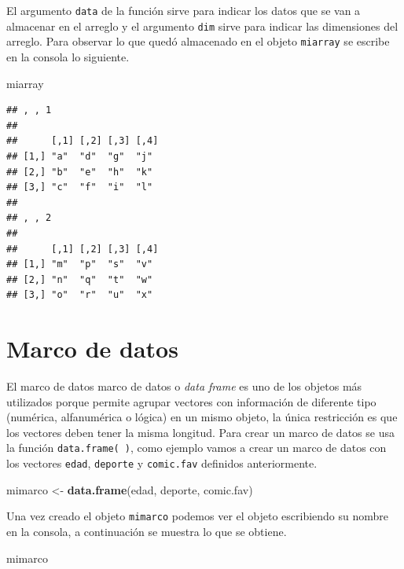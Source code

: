 \documentclass[10pt,]{krantz}
\makeatletter
\newenvironment{Shaded}{\begin{snugshade}}{\end{snugshade}}
\newcommand{\KeywordTok}[1]{\textcolor[rgb]{0.13,0.29,0.53}{\textbf{{#1}}}}
\newcommand{\StringTok}[1]{\textcolor[rgb]{0.31,0.60,0.02}{{#1}}}
\newcommand{\NormalTok}[1]{{#1}}
\newenvironment{kframe}{%
\medskip{}
\setlength{\fboxsep}{.8em}
 \def\at@end@of@kframe{}%
 \ifinner\ifhmode%
  \def\at@end@of@kframe{\end{minipage}}%
  \begin{minipage}{\columnwidth}%
 \fi\fi%
 \def\FrameCommand##1{\hskip\@totalleftmargin \hskip-\fboxsep
 \colorbox{shadecolor}{##1}\hskip-\fboxsep
     \hskip-\linewidth \hskip-\@totalleftmargin \hskip\columnwidth}%
 \MakeFramed {\advance\hsize-\width
   \@totalleftmargin\z@ \linewidth\hsize
   \@setminipage}}%
 {\par\unskip\endMakeFramed%
 \at@end@of@kframe}
\renewenvironment{Shaded}{\begin{kframe}}{\end{kframe}}
\makeatother
\begin{document}
El argumento \texttt{data} de la función sirve para indicar los datos
que se van a almacenar en el arreglo y el argumento \texttt{dim} sirve
para indicar las dimensiones del arreglo. Para observar lo que quedó
almacenado en el objeto \texttt{miarray} se escribe en la consola lo
siguiente.

\begin{Shaded}
\begin{Highlighting}[]
\NormalTok{miarray}
\end{Highlighting}
\end{Shaded}

\begin{verbatim}
## , , 1
## 
##      [,1] [,2] [,3] [,4]
## [1,] "a"  "d"  "g"  "j" 
## [2,] "b"  "e"  "h"  "k" 
## [3,] "c"  "f"  "i"  "l" 
## 
## , , 2
## 
##      [,1] [,2] [,3] [,4]
## [1,] "m"  "p"  "s"  "v" 
## [2,] "n"  "q"  "t"  "w" 
## [3,] "o"  "r"  "u"  "x"
\end{verbatim}

\section{\texorpdfstring{Marco de datos 
}{Marco de datos  }}\label{marco-de-datos}

El marco de datos marco de datos o \emph{data frame} es uno de los
objetos más utilizados porque permite agrupar vectores con información
de diferente tipo (numérica, alfanumérica o lógica) en un mismo objeto,
la única restricción es que los vectores deben tener la misma longitud.
Para crear un marco de datos se usa la función \texttt{data.frame(\ )},
como ejemplo vamos a crear un marco de datos con los vectores
\texttt{edad}, \texttt{deporte} y \texttt{comic.fav} definidos
anteriormente.

\begin{Shaded}
\begin{Highlighting}[]
\NormalTok{mimarco <-}\StringTok{ }\KeywordTok{data.frame}\NormalTok{(edad, deporte, comic.fav)}
\end{Highlighting}
\end{Shaded}

Una vez creado el objeto \texttt{mimarco} podemos ver el objeto
escribiendo su nombre en la consola, a continuación se muestra lo que se
obtiene.

\begin{Shaded}
\begin{Highlighting}[]
\NormalTok{mimarco}
\end{Highlighting}
\end{Shaded}
\end{document}
